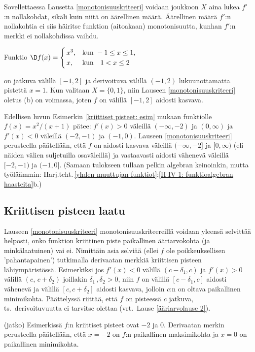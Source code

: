 Sovellettaessa Lausetta \ref{monotonisuuskriteeri} voidaan joukkoon $X$ aina lukea $f'$:n 
nollakohdat, sikäli kuin niitä on äärellinen määrä. Äärellinen määrä $f'$:n nollakohtia ei siis
häiritse funktion (aitoakaan) monotonisuutta, kunhan $f'$:n merkki ei nollakohdissa vaihdu.
\begin{Exa} Funktio
$\D f(x)=\begin{cases} 
         \,x^3, &\text{kun}\ -1\leq x\leq 1, \\ \,x, &\text{kun} \quad 1<x\leq 2
         \end{cases}$

on jatkuva välillä $[-1,2]$ ja derivoituva välillä $(-1,2)$ lukuunottamatta pistettä $x=1$.
Kun valitaan $X=\{0,1\}$, niin Lauseen \ref{monotonisuuskriteeri} oletus (b) on voimassa,
joten $f$ on välillä $[-1,2]$ aidosti kasvava. \loppu
\end{Exa}
\begin{Exa} \label{monotonisuus: esim} Edellisen luvun Esimerkin
\ref{kriittiset pisteet: esim} mukaan funktiolle $f(x)=x^2/(x+1)$ pätee: $f'(x)>0$
väleillä $(-\infty,-2)$ ja $(0,\infty)$ ja $f'(x)<0$ väleillä $(-2,-1)$ ja $(-1,0)$. Lauseen
\ref{monotonisuuskriteeri} perusteella päätellään, että $f$ on aidosti kasvava väleillä
$(-\infty,-2]$ ja $[0,\infty)$ (eli näiden välien suljetuilla osaväleillä) ja vastaavasti
aidosti vähenevä väleillä $[-2,-1)$ ja $(-1,0]$. 
(Samaan tulokseen tullaan pelkin algebran keinoinkin, mutta työläämmin:
Harj.teht.\,\ref{yhden muuttujan funktiot}:\ref{H-IV-1: funktioalgebran haasteita}b.)
\loppu \end{Exa}

\subsection{Kriittisen pisteen laatu}

Lauseen \ref{monotonisuuskriteeri} monotonisuuskriteereillä voidaan yleensä selvittää helposti,
onko funktion kriittinen piste paikallinen ääriarvokohta (ja minkälaatuinen) vai ei. Nimittäin
asia selviää (ellei $f$ ole poikkeuksellisen 'pahantapainen') tutkimalla derivaatan merkkiä 
kriittisen pisteen lähiympäristössä. Esimerkiksi jos $f'(x)<0$ välillä $(c-\delta_1,c)$ ja 
$f'(x)>0$ välillä $(c,\,c+\delta_2)$ joillakin $\delta_1\,,\delta_2>0$, niin $f$ on välillä 
$[c-\delta_1,c]$ aidosti vähenevä ja välillä $[c,c+\delta_2]$ aidosti kasvava, jolloin $c$:n 
on oltava paikallinen minimikohta. Päättelyssä riittää, että $f$ on pisteessä $c$ jatkuva, ts.\
derivoituvuutta ei tarvitse olettaa (vrt.\ Lause \ref{ääriarvolause 2}).
\jatko \begin{Exa} (jatko) Esimerkissä $f$:n kriittiset pisteet ovat $-2$ ja $0$. Derivaatan
merkin perusteella päätellään, että $x=-2$ on $f$:n paikallinen maksimikohta ja $x=0$ on
paikallinen minimikohta. \loppu
\end{Exa}

